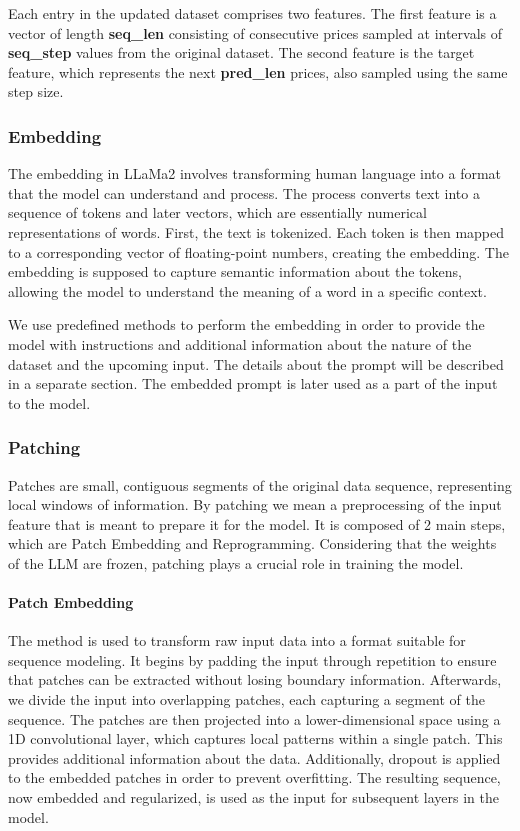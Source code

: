 Each entry in the updated dataset comprises two features. The first feature is a vector of length \textbf{seq\_len} consisting of consecutive prices sampled at intervals of \textbf{seq\_step} values from the original dataset. The second feature is the target feature, which represents the next \textbf{pred\_len} prices, also sampled using the same step size.

\subsubsection*{Embedding}
The embedding in LLaMa2 involves transforming human language into a format that the model can understand and process. The process converts text into a sequence of tokens and later vectors, which are essentially numerical representations of words. First, the text is tokenized. Each token is then mapped to a corresponding vector of floating-point numbers, creating the embedding. The embedding is supposed to capture semantic information about the tokens, allowing the model to understand the meaning of a word in a specific context.

We use predefined methods to perform the embedding in order to provide the model with instructions and additional information about the nature of the dataset and the upcoming input. The details about the prompt will be described in a separate section. The embedded prompt is later used as a part of the input to the model.

\subsubsection*{Patching}
Patches are small, contiguous segments of the original data sequence, representing local windows of information. By patching we mean a preprocessing of the input feature that is meant to prepare it for the model. It is composed of 2 main steps, which are Patch Embedding and Reprogramming. Considering that the weights of the LLM are frozen, patching plays a crucial role in training the model.

\paragraph{Patch Embedding}
The method is used to transform raw input data into a format suitable for sequence modeling. It begins by padding the input through repetition to ensure that patches can be extracted without losing boundary information. Afterwards, we divide the input into overlapping patches, each capturing a segment of the sequence. The patches are then projected into a lower-dimensional space using a 1D convolutional layer, which captures local patterns within a single patch. This provides additional information about the data. Additionally, dropout is applied to the embedded patches in order to prevent overfitting. The resulting sequence, now embedded and regularized, is used as the input for subsequent layers in the model.

